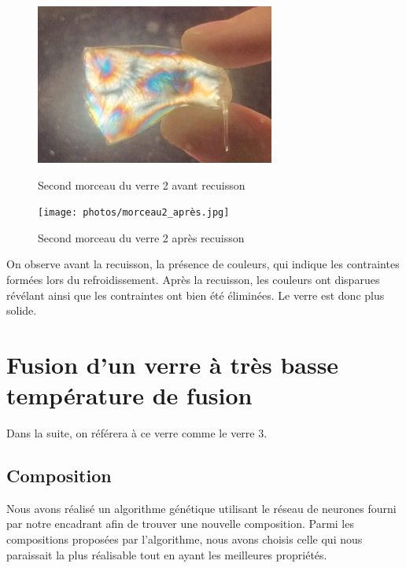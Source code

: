 \documentclass{article}
\begin{document}
\begin{figure}[ht]
    \centering
    \begin{minipage}{0.45\textwidth}
        \centering
        \includegraphics[width=0.7\textwidth]{photos/morceau2_avant.jpg}
        \caption{Second morceau du verre 2 avant recuisson}
    \end{minipage}
    \hspace{0.5cm}
    \begin{minipage}{0.45\textwidth}
        \centering
        \texttt{[image: photos/morceau2\_après.jpg]}
        \caption{Second morceau du verre 2 après recuisson}
    \end{minipage}
\end{figure}

On observe avant la recuisson, la présence de couleurs, qui indique les contraintes formées lors du refroidissement. Après la recuisson, les couleurs ont disparues révélant ainsi que les contraintes ont bien été éliminées. Le verre est donc plus solide.


\section{Fusion d'un verre à très basse température de fusion}

Dans la suite, on référera à ce verre comme le verre 3.

\subsection{Composition}

Nous avons réalisé un algorithme génétique utilisant le réseau de neurones fourni par notre encadrant afin de trouver une nouvelle composition. 
Parmi les compositions proposées par l'algorithme, nous avons choisis celle qui nous paraissait la plus réalisable tout en ayant les meilleures propriétés.
\end{document}
